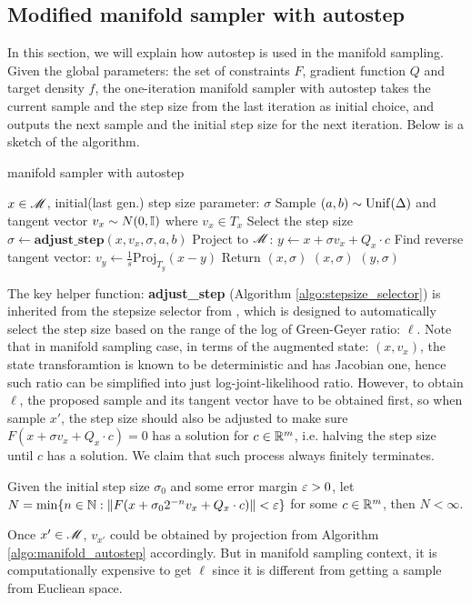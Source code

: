 \documentclass{article}
\begin{document}
\subsection{Modified manifold sampler with autostep}
In this section, we will explain how autostep is used in the manifold sampling. Given the global parameters: the set of constraints $F$, gradient function $Q$ and target density $f$, the one-iteration manifold sampler with autostep takes the current sample and the step size from the last iteration as initial choice, and outputs the next sample and the initial step size for the next iteration. Below is a sketch of the algorithm.
\begin{algorithm}[H]
\caption{manifold sampler with autostep}
\label{algo:manifold_autostep}
\begin{algorithmic}[1]  
    \Require $x \in \mathscr{M}$, initial(last gen.) step size parameter: $\sigma$
    \State Sample $(a, b) \sim \operatorname{Unif}(\Delta)$ and tangent vector $v_x \sim N(0, \mathbb I)$ where $v_x \in T_x$
    \State Select the step size $\sigma \gets \textbf{adjust\_step}(x, v_x, \sigma, a, b)$ 
    \State Project to $\mathscr{M}$: $y \gets x + \sigma v_x + Q_x\cdot c$ 
    \State Find reverse tangent vector: $v_y \gets \frac{1}{s} \text{Proj}_{T_y}(x-y)$
      
        \State Return $(x, \sigma)$
    \EndIf
     
        \State \Return $(x, \sigma)$
    \EndIf
    \State \Return $(y, \sigma)$
    \end{algorithmic}
\end{algorithm}
The key helper function: \textbf{adjust\_step} (Algorithm \ref{algo:stepsize_selector}) is inherited from the stepsize selector from \cite{autostep}, which is designed to automatically select the step size based on the range of the log of Green-Geyer ratio: $\ell$. Note that in manifold sampling case, in terms of the augmented state: $(x, v_x)$, the state transforamtion is known to be deterministic and has Jacobian one, hence such ratio can be simplified into just log-joint-likelihood ratio. However, to obtain $\ell$, the proposed sample and its tangent vector have to be obtained first, so when sample $x'$, the step size should also be adjusted to make sure $F(x + \sigma v_x + Q_x \cdot c) = 0$ has a solution for $c \in \mathbb R^m$, i.e. halving the step size until $c$ has a solution. We claim that such process always finitely terminates. 
\begin{lemma}\label{lemma:finte_solver}
Given the initial step size $\sigma_0$ and some error margin $\varepsilon > 0$, let $N = \min\{n \in \mathbb N : \left\lVert F(x + \sigma_0 2^{-n} v_x + Q_x \cdot c)\right\rVert < \varepsilon\}$ for some $c \in \mathbb R^m$, then $N < \infty$.
\end{lemma}
Once $x' \in \mathscr{M}$, $v_{x'}$ could be obtained by projection from Algorithm \ref{algo:manifold_autostep} accordingly. But in manifold sampling context, it is computationally expensive to get $\ell$ since it is different from getting a sample from Eucliean space.
\end{document}
